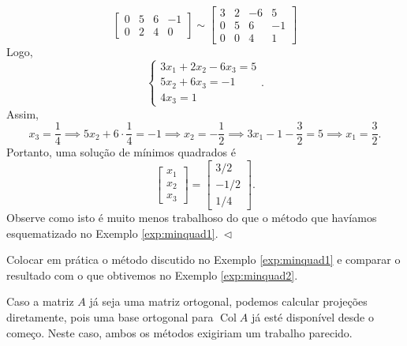 \begin{ex}
\begin{equation}
\begin{bmatrix}
    0 & 5 &  6 & -1 \\
    0 & 2 &  4 & 0
  \end{bmatrix} \sim
  \begin{bmatrix}
    3 & 2 & -6 & 5 \\
    0 & 5 &  6 & -1 \\
    0 & 0 &  4 & 1
  \end{bmatrix}
  \end{equation} Logo,
  \begin{equation}
  \left\{
    \begin{array}{ll}
      3 x_1 + 2 x_2 - 6 x_3 = 5 \\
      5x_2 + 6 x_3 = -1 \\
      4x_3 = 1
    \end{array}
  \right..
  \end{equation} Assim,
  \begin{equation}
  x_3 = \frac{1}{4} \implies 5x_2 + 6 \cdot \frac{1}{4} = -1 \implies x_2 = -\frac{1}{2} \implies 3 x_1 - 1 - \frac{3}{2}  = 5 \implies x_1 = \frac{3}{2}.
  \end{equation} Portanto, uma solução de mínimos quadrados é
  \begin{equation}
  \begin{bmatrix}
    x_1 \\ x_2 \\ x_3
  \end{bmatrix} =
  \begin{bmatrix}
    3/2 \\ -1/2 \\ 1/4
  \end{bmatrix}.
  \end{equation} Observe como isto é muito menos trabalhoso do que o método que havíamos esquematizado no Exemplo \ref{exp:minquad1}$. \ \lhd$
\end{ex}

\begin{exer}
  Colocar em prática o método discutido no Exemplo \ref{exp:minquad1} e comparar o resultado com o que obtivemos no Exemplo \ref{exp:minquad2}.
\end{exer}

\begin{obs}
  Caso a matriz $A$ já seja uma matriz ortogonal, podemos calcular projeções diretamente, pois uma base ortogonal para $\operatorname{Col} A$ já esté disponível desde o começo. Neste caso, ambos os métodos exigiriam um trabalho parecido.
\end{obs}

